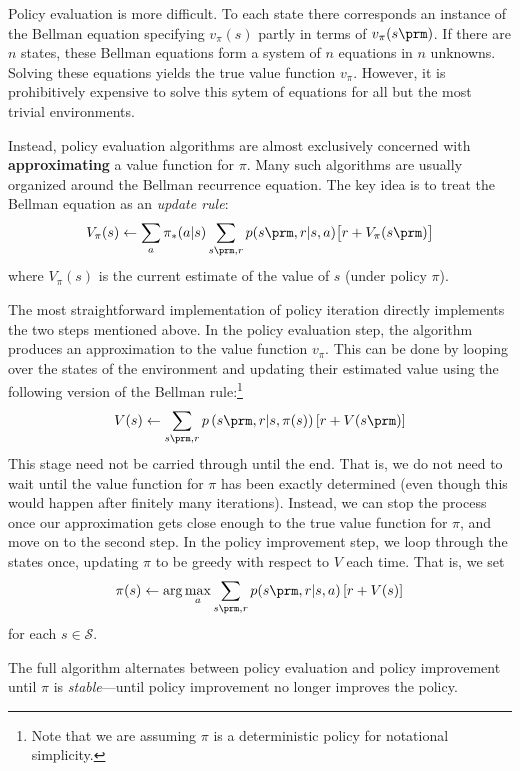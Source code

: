 \documentclass{my-tufte}
\begin{document}
Policy evaluation is more difficult.
To each state there corresponds an instance of the Bellman equation specifying $v_\pi(s)$ partly in terms of $v_\pi(s\prm)$.
If there are $n$ states, these Bellman equations form a system of $n$ equations in $n$ unknowns.
Solving these equations yields the true value function $v_\pi$.
However, it is prohibitively expensive to solve this sytem of equations for all but the most trivial environments.

Instead, policy evaluation algorithms are almost exclusively concerned with \textbf{approximating} a value function for $\pi$.
Many such algorithms are usually organized around the Bellman recurrence equation.
The key idea is to treat the Bellman equation as an \emph{update rule}:
\begin{align*}
	V_{\pi}(s) \leftarrow \sum_a \pi_*(a|s) \sum_{s\prm, r} p(s\prm, r | s, a) \big [ r + V_{\pi}(s\prm) \big ]
\end{align*}
where $V_\pi(s)$ is the current estimate of the value of $s$ (under policy $\pi$).

The most straightforward implementation of policy iteration directly implements the two steps mentioned above.
In the policy evaluation step, the algorithm produces an approximation to the value function $v_\pi$.
This can be done by looping over the states of the environment and updating their estimated value using the following version of the Bellman rule:\footnote{Note that we are assuming $\pi$ is a deterministic policy for notational simplicity.}
\begin{align*}
	V(s) \leftarrow \sum_{s\prm, r} p \left (s\prm, r | s, \pi(s) \right ) \left [ r + V(s\prm) \right ]
\end{align*}
This stage need not be carried through until the end.
That is, we do not need to wait until the value function for $\pi$ has been exactly determined (even though this would happen after finitely many iterations).
Instead, we can stop the process once our approximation gets close enough to the true value function for $\pi$, and move on to the second step.
In the policy improvement step, we loop through the states once, updating $\pi$ to be greedy with respect to $V$ each time.
That is, we set
\begin{align*}
	\pi(s) \leftarrow \arg \max_a \sum_{s\prm, r} p(s\prm, r | s, a) \left [ r + V(s) \right ]
\end{align*}
for each $s \in \mathcal S$.

The full algorithm alternates between policy evaluation and policy improvement until $\pi$ is \emph{stable}---until policy improvement no longer improves the policy.
\end{document}
